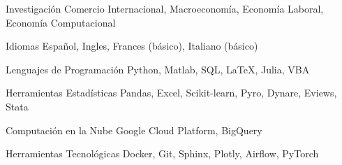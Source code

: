 

\begin{cvskills}

\cvskill
    {Investigación} %
    {Comercio Internacional, Macroeconomía, Economía Laboral, Economía Computacional} %

\cvskill
    {Idiomas} %
    {Español, Ingles, Frances (básico), Italiano (básico)} %

\cvskill
    {Lenguajes de Programación} %
    {Python, Matlab, SQL, LaTeX, Julia, VBA} %

\cvskill
    {Herramientas Estadísticas} %
    {Pandas, Excel, Scikit-learn, Pyro, Dynare, Eviews, Stata} %

\cvskill
    {Computación en la Nube} %
    {Google Cloud Platform, BigQuery} %

\cvskill
    {Herramientas Tecnológicas} %
    {Docker, Git, Sphinx, Plotly, Airflow, PyTorch} %

\end{cvskills}

